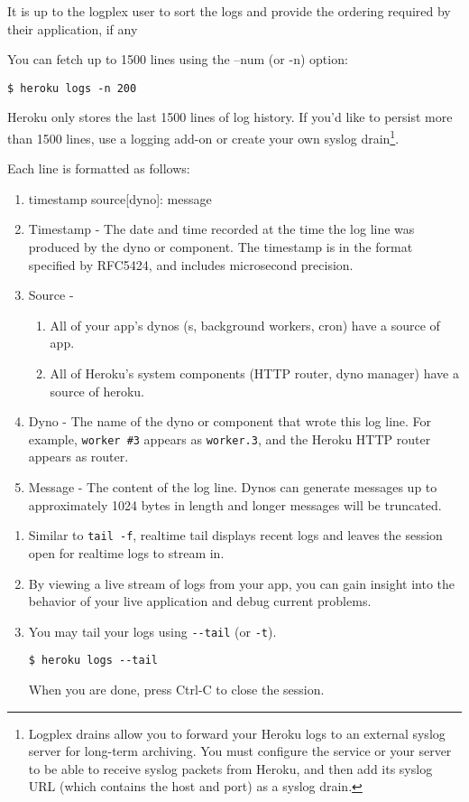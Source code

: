 It is up to the logplex user to sort
the logs and provide the ordering required by their application,
if any


You can fetch up to 1500 lines using the --num (or -n) option:
\begin{verbatim}
$ heroku logs -n 200
\end{verbatim}
Heroku only stores the last 1500 lines of log history. If you’d
like to persist more than 1500 lines, use a logging add-on or create
your own syslog drain\footnote{Logplex drains allow you to forward
your Heroku logs to an external syslog server for long-term archiving.
You must configure the service or your server to be able to receive
syslog packets from Heroku, and then add its syslog URL (which
contains the host and port) as a syslog drain.}.


Each line is formatted as follows:
\begin{enumerate}
\item 
timestamp source[dyno]: message
\item 
Timestamp - The date and time recorded at the time the log line was produced by the dyno or component. The timestamp is in the format specified by RFC5424, and includes microsecond precision.
\item 
Source - 
  \begin{enumerate}
  \item 
  All of your app’s dynos (s, background workers, cron) have a source of app. 
  \item 
  All of Heroku’s system components (HTTP router, dyno manager) have a source of heroku.
  \end{enumerate}
\item 
Dyno - The name of the dyno or component that wrote this log line.
For example, \verb|worker #3| appears as \verb|worker.3|, and the Heroku HTTP
router appears as router.
\item 
Message - The content of the log line. Dynos can generate messages
up to approximately 1024 bytes in length and longer messages will
be truncated. 
\end{enumerate}


\begin{enumerate}
\item 
Similar to \verb|tail -f|, realtime tail displays recent logs and leaves
the session open for realtime logs to stream in. 
\item 
By viewing a live
stream of logs from your app, you can gain insight into the behavior
of your live application and debug current problems.
\item 
You may tail your logs using \verb|--tail| (or \verb|-t|).
\begin{verbatim}
$ heroku logs --tail
\end{verbatim}
When you are done, press Ctrl-C to close the session.
\end{enumerate}

